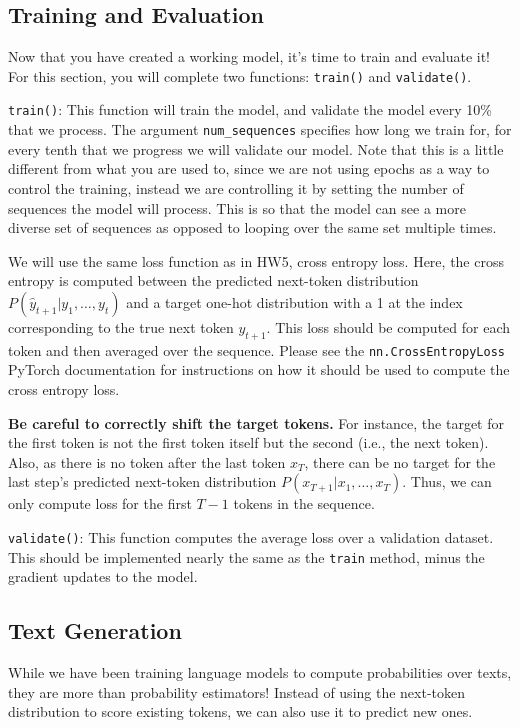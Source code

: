 \documentclass[11pt,addpoints,answers]{exam}
\begin{document}
\subsection{Training and Evaluation}\label{train_and_eval}

Now that you have created a working model, it's time to train and evaluate it! For this section, you will complete two functions: \texttt{train()} and \texttt{validate()}.

\texttt{train()}: This function will train the model, and validate the model every 10\% that we process. The argument \texttt{num\_sequences} specifies how long we train for, for every tenth that we progress we will validate our model. Note that this is a little different from what you are used to, since we are not using epochs as a way to control the training, instead we are controlling it by setting the number of sequences the model will process. This is so that the model can see a more diverse set of sequences as opposed to looping over the same set multiple times.

We will use the same loss function as in HW5, cross entropy loss. Here, the cross entropy is computed between the predicted next-token distribution $P(\hat{y}_{t+1}|y_1, \ldots, y_t)$ and a target one-hot distribution with a 1 at the index corresponding to the true next token $y_{t+1}$. This loss should be computed for each token and then averaged over the sequence. Please see the \texttt{nn.CrossEntropyLoss} PyTorch documentation for instructions on how it should be used to compute the cross entropy loss.

\textbf{Be careful to correctly shift the target tokens.} For instance, the target for the first token is not the first token itself but the second (i.e., the next token). Also, as there is no token after the last token $x_T$, there can be no target for the last step's predicted next-token distribution $P(x_{T+1} | x_1, \ldots, x_T)$. Thus, we can only compute loss for the first $T-1$ tokens in the sequence.

\texttt{validate()}: This function computes the average loss over a validation dataset. This should be implemented nearly the same as the \texttt{train} method, minus the gradient updates to the model.

\subsection{Text Generation}
While we have been training language models to compute probabilities over texts, they are more than probability estimators! Instead of using the next-token distribution to score existing tokens, we can also use it to predict new ones.
\end{document}
